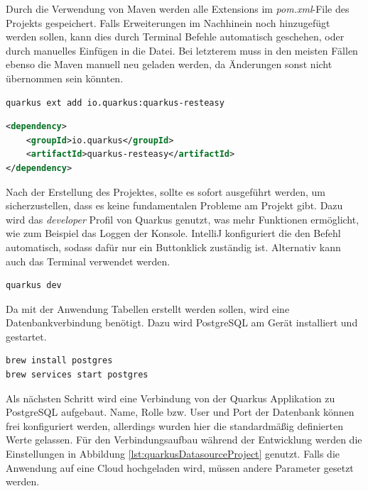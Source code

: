 Durch die Verwendung von Maven werden alle Extensions im \emph{pom.xml}-File des Projekts gespeichert. 
Falls Erweiterungen im Nachhinein noch hinzugefügt werden sollen, kann dies durch Terminal Befehle automatisch geschehen, oder durch manuelles Einfügen in die Datei. 
Bei letzterem muss in den meisten Fällen ebenso die Maven manuell neu geladen werden, da Änderungen sonst nicht übernommen sein könnten. 

\begin{lstlisting}[label=lst:quarkus:mvnextension, language=xml, caption=Quarkus-\gls{cli}-Befehl für RESTEasy Classic]
    quarkus ext add io.quarkus:quarkus-resteasy
\end{lstlisting}

\begin{lstlisting}[label=lst:quarkus:mvnextension, language=xml, caption=Extension RESTEasy Classic in pom.xml]
<dependency>
    <groupId>io.quarkus</groupId>
    <artifactId>quarkus-resteasy</artifactId>
</dependency>
\end{lstlisting}

Nach der Erstellung des Projektes, sollte es sofort ausgeführt werden, um sicherzustellen, dass es keine fundamentalen Probleme am Projekt gibt. 
Dazu wird das \emph{developer} Profil von Quarkus genutzt, was mehr Funktionen ermöglicht, wie zum Beispiel das Loggen der Konsole.
IntelliJ konfiguriert die den Befehl automatisch, sodass dafür nur ein Buttonklick zuständig ist. 
Alternativ kann auch das Terminal verwendet werden. 
\begin{lstlisting}[label=lst:quarkus:devrun, language=bash, caption=Quarkus-\gls{cli}-Befehl zum Starten]
quarkus dev
\end{lstlisting}
 
Da mit der Anwendung Tabellen erstellt werden sollen, wird eine Datenbankverbindung benötigt. 
Dazu wird PostgreSQL am Gerät installiert und gestartet. 
\begin{lstlisting}[label=lst:quarkus:devrun, language=bash, caption=Homebrew Installation und Ausführung PostgreSQL]
brew install postgres
brew services start postgres
\end{lstlisting}

Als nächsten Schritt wird eine Verbindung von der Quarkus Applikation zu PostgreSQL aufgebaut. 
Name, Rolle bzw. User und Port der Datenbank können frei konfiguriert werden, allerdings wurden hier die standardmäßig definierten Werte gelassen. 
Für den Verbindungsaufbau während der Entwicklung werden die Einstellungen in Abbildung \ref{lst:quarkusDatasourceProject} genutzt. 
Falls die Anwendung auf eine Cloud hochgeladen wird, müssen andere Parameter gesetzt werden.

